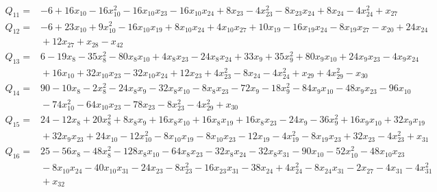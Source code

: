 {\begin{align*}
\end{align*}
\begin{align*}
 Q_{11}={}&-6 +16x_{10} -16x_{10}^{2} -16x_{10}x_{23} -16x_{10}x_{24} +8x_{23} -4x_{23}^{2} -8x_{23}x_{24} +8x_{24} -4x_{24}^{2} +x_{27}
\end{align*}
\begin{align*}
 Q_{12}={}&-6 +23x_{10} +9x_{10}^{2} -16x_{10}x_{19} +8x_{10}x_{24} +4x_{10}x_{27} +10x_{19} -16x_{19}x_{24} -8x_{19}x_{27} -x_{20} +24x_{24}\\
 &{}+12x_{27} +x_{28} -x_{42}
\end{align*}
\begin{align*}
 Q_{13}={}&6 -19x_{8} -35x_{8}^{2} -80x_{8}x_{10} +4x_{8}x_{23} -24x_{8}x_{24} +33x_{9} +35x_{9}^{2} +80x_{9}x_{10} +24x_{9}x_{23} -4x_{9}x_{24}\\
 &{}+16x_{10} +32x_{10}x_{23} -32x_{10}x_{24} +12x_{23} +4x_{23}^{2} -8x_{24} -4x_{24}^{2} +x_{29} +4x_{29}^{2} -x_{30}
\end{align*}
\begin{align*}
 Q_{14}={}&90 -10x_{8} -2x_{8}^{2} -24x_{8}x_{9} -32x_{8}x_{10} -8x_{8}x_{23} -72x_{9} -18x_{9}^{2} -84x_{9}x_{10} -48x_{9}x_{23} -96x_{10}\\
 &{}-74x_{10}^{2} -64x_{10}x_{23} -78x_{23} -8x_{23}^{2} -4x_{29}^{2} +x_{30}
\end{align*}
\begin{align*}
 Q_{15}={}&24 -12x_{8} +20x_{8}^{2} +8x_{8}x_{9} +16x_{8}x_{10} +16x_{8}x_{19} +16x_{8}x_{23} -24x_{9} -36x_{9}^{2} +16x_{9}x_{10} +32x_{9}x_{19}\\
 &{}+32x_{9}x_{23} +24x_{10} -12x_{10}^{2} -8x_{10}x_{19} -8x_{10}x_{23} -12x_{19} -4x_{19}^{2} -8x_{19}x_{23} +32x_{23} -4x_{23}^{2} +x_{31}
\end{align*}
\begin{align*}
 Q_{16}={}&25 -56x_{8} -48x_{8}^{2} -128x_{8}x_{10} -64x_{8}x_{23} -32x_{8}x_{24} -32x_{8}x_{31} -90x_{10} -52x_{10}^{2} -48x_{10}x_{23}\\
 &{}-8x_{10}x_{24} -40x_{10}x_{31} -24x_{23} -8x_{23}^{2} -16x_{23}x_{31} -38x_{24} +4x_{24}^{2} -8x_{24}x_{31} -2x_{27} -4x_{31} -4x_{31}^{2}\\
 &{}+x_{32}
\end{align*}
\begin{align*}

\end{align*}}
